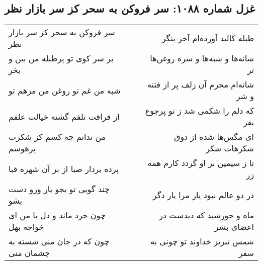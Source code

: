 \begin{center}
\section*{غزل شماره ۱۰۸۸: سر فروکن به سحر کز سر بازار نظر}
\label{sec:1088}
\begin{longtable}{l p{0.5cm} r}
سر فروکن به سحر کز سر بازار نظر
&&
طبله کالبد آورده‌ام آخر بنگر
\\
بر سر کوی تو پرطبله من بین و بخر
&&
شانه‌ها و شبه‌ها و سره روغن‌ها تر
\\
شبه من غم تو روغن من مرهم تو
&&
شانه‌ام محرم آن زلف پر از فتنه و شر
\\
از فراقت تلفم گشته خیالت علفم
&&
که دلم را شکمی شد ز تو پرجوع بقر
\\
من ندانم چه کسم کز شکرت پرهوسم
&&
ای مگس‌ها شده از ذوق شکرهات شکر
\\
پرده بردار صبا از بر آن شهره قبا
&&
تا ز سیمین بر او گردد کارم همه زر
\\
چند گویی تو بجو یار وزو دست بشو
&&
در دو عالم نبود یار مرا یار دگر
\\
چون خرد ماند و دل با من ای خواجه بهل
&&
ماه و خورشید که دیدست در اعضای بشر
\\
چون که در جان منی شسته به چشمان منی
&&
شمس تبریز خداوند تو چونی به سفر
\\
\end{longtable}
\end{center}
